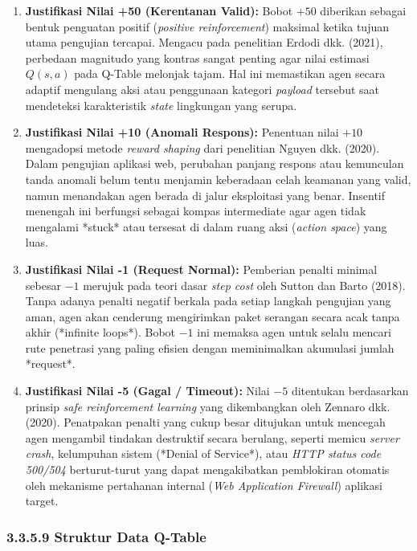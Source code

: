 \begin{enumerate}
    \item \textbf{Justifikasi Nilai +50 (Kerentanan Valid):} Bobot $+50$ diberikan sebagai bentuk penguatan positif (\textit{positive reinforcement}) maksimal ketika tujuan utama pengujian tercapai. Mengacu pada penelitian Erdodi dkk. (2021), perbedaan magnitudo yang kontras sangat penting agar nilai estimasi $Q(s,a)$ pada Q-Table melonjak tajam. Hal ini memastikan agen secara adaptif mengulang aksi atau penggunaan kategori \textit{payload} tersebut saat mendeteksi karakteristik \textit{state} lingkungan yang serupa.
    \item \textbf{Justifikasi Nilai +10 (Anomali Respons):} Penentuan nilai $+10$ mengadopsi metode \textit{reward shaping} dari penelitian Nguyen dkk. (2020). Dalam pengujian aplikasi web, perubahan panjang respons atau kemunculan tanda anomali belum tentu menjamin keberadaan celah keamanan yang valid, namun menandakan agen berada di jalur eksploitasi yang benar. Insentif menengah ini berfungsi sebagai kompas intermediate agar agen tidak mengalami *stuck* atau tersesat di dalam ruang aksi (\textit{action space}) yang luas.
    \item \textbf{Justifikasi Nilai -1 (Request Normal):} Pemberian penalti minimal sebesar $-1$ merujuk pada teori dasar \textit{step cost} oleh Sutton dan Barto (2018). Tanpa adanya penalti negatif berkala pada setiap langkah pengujian yang aman, agen akan cenderung mengirimkan paket serangan secara acak tanpa akhir (*infinite loops*). Bobot $-1$ ini memaksa agen untuk selalu mencari rute penetrasi yang paling efisien dengan meminimalkan akumulasi jumlah *request*.
    \item \textbf{Justifikasi Nilai -5 (Gagal / Timeout):} Nilai $-5$ ditentukan berdasarkan prinsip \textit{safe reinforcement learning} yang dikembangkan oleh Zennaro dkk. (2020). Penatpakan penalti yang cukup besar ditujukan untuk mencegah agen mengambil tindakan destruktif secara berulang, seperti memicu \textit{server crash}, kelumpuhan sistem (*Denial of Service*), atau \textit{HTTP status code 500/504} berturut-turut yang dapat mengakibatkan pemblokiran otomatis oleh mekanisme pertahanan internal (\textit{Web Application Firewall}) aplikasi target.
\end{enumerate}

\subsubsection{3.3.5.9 Struktur Data Q-Table}

